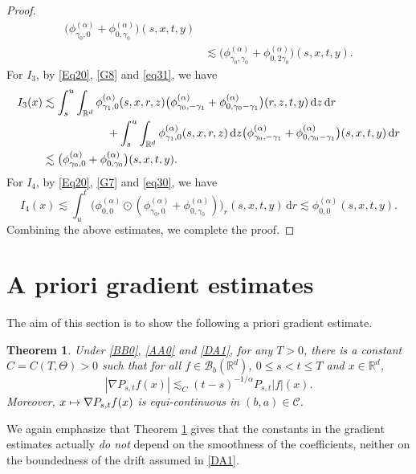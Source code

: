 \documentclass[11pt]{article}
\numberwithin{equation}{section}\providecommand{\asymp}{\mathrel{\sim}}
\def\mto{\mathchoice{\longmapsto}{\mapsto}{\mapsto}{\mapsto}}
\theoremstyle{plain}
\newtheorem{theorem}{Theorem}[section]
\theoremstyle{definition}
\newcommand\cB{{\mathcal B}}
\newcommand\mR{\mathbb{R}}
\newcommand\1{{\mathbf{1}}}
\newcommand\sC{{\mathscr C}}
\newcommand{\dif}{\,\mathrm{d}}
\begin{document}
\begin{proof}
\begin{align*}
\bigl(\phi^{(\alpha)}_{\gamma_0,0}+\phi^{(\alpha)}_{0,\gamma_0}\bigr)(s,x,t,y)
\\&\lesssim\bigl(\phi^{(\alpha)}_{\gamma_0,\gamma_0}+\phi^{(\alpha)}_{0,2\gamma_0}\bigr)(s,x,t,y).
\end{align*}
For $I_3$, by {\eqref{Eq20}}, \eqref{G8} and \eqref{eq31}, we have
\begin{align*}
I_3(x)&\lesssim\int^u_s\int_{\mR^d}\phi^{(\alpha)}_{\gamma_1,0}(s,x,r,z)\bigl(\phi^{(\alpha)}_{\gamma_0,-\gamma_1}
+\phi^{(\alpha)}_{0,\gamma_0-\gamma_1}\bigr)(r,z,t,y)\dif z\dif r\\
&\hspace*{2cm}+\int^u_s\int_{\mR^d}\phi^{(\alpha)}_{\gamma_1,0}(s,x,r,z)\dif z
\bigl(\phi^{(\alpha)}_{\gamma_0,-\gamma_1}
+\phi^{(\alpha)}_{0,\gamma_0-\gamma_1}\bigr)(s,x,t,y)\dif r\\
&\lesssim \bigl(\phi^{(\alpha)}_{\gamma_0,0}+\phi^{(\alpha)}_{0,\gamma_0}\bigr)(s,x,t,y).
\end{align*}
For $I_4$, by \eqref{Eq20}, \eqref{G7} and \eqref{eq30}, we have
\begin{equation*}
I_4(x)\lesssim\int^t_u\bigl(\phi^{(\alpha)}_{0,0}\odot(\phi^{(\alpha)}_{\gamma_0,0}
+\phi^{(\alpha)}_{0,\gamma_0})\bigr)_r(s,x,t,y)\dif r\lesssim\phi^{(\alpha)}_{0,0}(s,x,t,y).
\end{equation*}
Combining the above estimates, we complete the proof.
\end{proof}

\section{A priori gradient estimates}\label{SEC_GRAD}

The aim of this section is to show the following a priori gradient estimate.

\begin{theorem}\label{Th41}
Under \eqref{BB0}, \eqref{AA0} and \eqref{DA1}, for any $T>0$, there is a constant $C=C(T,\Theta)>0$ such that
for all $f\in \cB_b(\mR^d)$,
$0\leq s<t\leq T$ and $x\in\mR^d$,
\begin{equation}\label{DQ1}
|\nabla P_{s,t}f(x)|\lesssim_C (t-s)^{-1/\alpha}P_{s,t}|f|(x).
\end{equation}
Moreover, $x\mto \nabla P_{s,t}f(x)$ is equi-continuous in $(b,a)\in\sC$.
\end{theorem}

{We again emphasize that Theorem \ref{Th41} gives that the constants in the gradient estimates actually \emph{do not} depend on the smoothness of the coefficients, neither on the boundedness of the drift assumed in \eqref{DA1}}.
\end{document}
